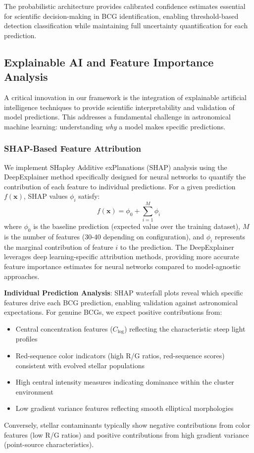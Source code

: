 \documentclass[twocolumn,10pt]{aastex631}
\begin{document}
The probabilistic architecture provides calibrated confidence estimates essential for scientific decision-making in BCG identification, enabling threshold-based detection classification while maintaining full uncertainty quantification for each prediction.

\subsection{Explainable AI and Feature Importance Analysis}

A critical innovation in our framework is the integration of explainable artificial intelligence techniques to provide scientific interpretability and validation of model predictions. This addresses a fundamental challenge in astronomical machine learning: understanding \emph{why} a model makes specific predictions.

\subsubsection{SHAP-Based Feature Attribution}

We implement SHapley Additive exPlanations (SHAP) analysis using the DeepExplainer method specifically designed for neural networks to quantify the contribution of each feature to individual predictions. For a given prediction $f(\mathbf{x})$, SHAP values $\phi_i$ satisfy:
\begin{equation}
f(\mathbf{x}) = \phi_0 + \sum_{i=1}^{M} \phi_i
\end{equation}
where $\phi_0$ is the baseline prediction (expected value over the training dataset), $M$ is the number of features (30-40 depending on configuration), and $\phi_i$ represents the marginal contribution of feature $i$ to the prediction. The DeepExplainer leverages deep learning-specific attribution methods, providing more accurate feature importance estimates for neural networks compared to model-agnostic approaches.

\textbf{Individual Prediction Analysis}: SHAP waterfall plots reveal which specific features drive each BCG prediction, enabling validation against astronomical expectations. For genuine BCGs, we expect positive contributions from:
\begin{itemize}
\item Central concentration features ($C_{\text{log}}$) reflecting the characteristic steep light profiles
\item Red-sequence color indicators (high R/G ratios, red-sequence scores) consistent with evolved stellar populations
\item High central intensity measures indicating dominance within the cluster environment
\item Low gradient variance features reflecting smooth elliptical morphologies
\end{itemize}
Conversely, stellar contaminants typically show negative contributions from color features (low R/G ratios) and positive contributions from high gradient variance (point-source characteristics).
\end{document}
